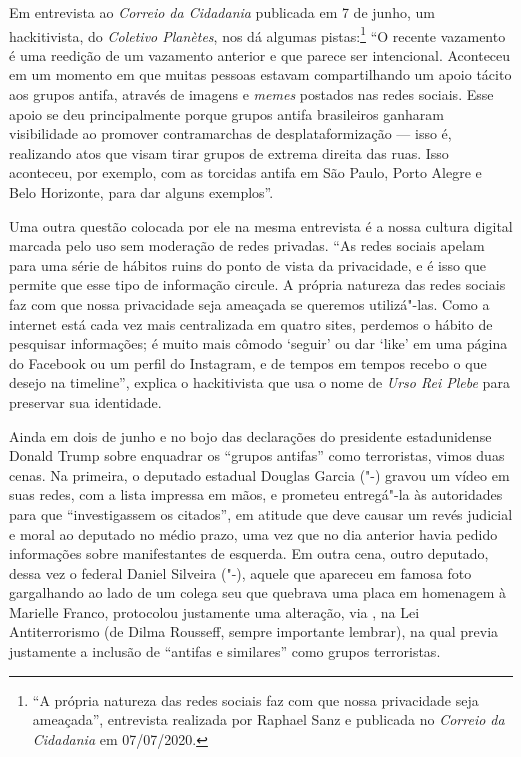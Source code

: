 Em entrevista ao \emph{Correio da Cidadania} publicada em 7 de junho, um
hackitivista, do \emph{Coletivo Planètes}, nos dá algumas pistas:\footnote{``A própria natureza das redes sociais faz com que nossa
privacidade seja ameaçada'', entrevista realizada por Raphael Sanz e
publicada no \emph{Correio da Cidadania} em 07/07/2020.} ``O
recente vazamento é uma reedição de um vazamento anterior e que parece
ser intencional. Aconteceu em um momento em que muitas pessoas estavam
compartilhando um apoio tácito aos grupos antifa, através de
imagens e \emph{memes} postados nas redes sociais. Esse apoio se deu
principalmente porque grupos antifa brasileiros ganharam visibilidade ao
promover contramarchas de desplataformização --- isso é, realizando atos
que visam tirar grupos de extrema direita das ruas. Isso aconteceu, por
exemplo, com as torcidas antifa em São Paulo, Porto Alegre e Belo
Horizonte, para dar alguns exemplos''.

Uma outra questão colocada por ele na mesma entrevista é a nossa cultura
digital marcada pelo uso sem moderação de redes privadas. ``As redes
sociais apelam para uma série de hábitos ruins do ponto de vista da
privacidade, e é isso que permite que esse tipo de informação circule. A
própria natureza das redes sociais faz com que nossa privacidade seja
ameaçada se queremos utilizá"-las. Como a internet está cada vez mais
centralizada em quatro sites, perdemos o hábito de pesquisar
informações; é muito mais cômodo `seguir' ou dar `like' em uma página do
Facebook ou um perfil do Instagram, e de tempos em tempos recebo o que
desejo na timeline'', explica o hackitivista que usa o nome de
\emph{Urso Rei Plebe} para preservar sua identidade.

Ainda em dois de junho e no bojo das declarações do presidente
estadunidense Donald Trump sobre enquadrar os ``grupos antifas'' como
terroristas, vimos duas cenas. Na primeira, o deputado estadual Douglas
Garcia ("-) gravou um vídeo em suas redes, com a lista impressa em
mãos, e prometeu entregá"-la às autoridades para que ``investigassem os
citados'', em atitude que deve causar um revés judicial e moral ao
deputado no médio prazo, uma vez que no dia anterior havia pedido
informações sobre manifestantes de esquerda. Em outra cena, outro
deputado, dessa vez o federal Daniel Silveira ("-), aquele que
apareceu em famosa foto gargalhando ao lado de um colega seu que
quebrava uma placa em homenagem à Marielle Franco, protocolou justamente
uma alteração, via , na Lei Antiterrorismo (de Dilma Rousseff, sempre
importante lembrar), na qual previa justamente a inclusão de
``antifas e similares'' como grupos terroristas.

